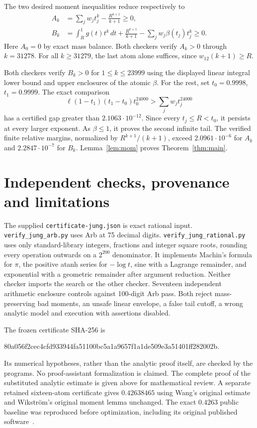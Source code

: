 \documentclass[11pt]{article}
\begin{document}
The two desired moment inequalities reduce respectively to
\begin{align*}
 A_k&=\sum_jw_jt_j^k-\frac{R^{k+1}}{k+1}\ge0,\\
 B_k&=\int_R^1g(t)t^k\,dt+\frac{R^{k+1}}{k+1}
       -\sum_jw_j\beta(t_j)t_j^k\ge0.
\end{align*}
Here $A_0=0$ by exact mass balance. Both checkers verify $A_k>0$ through
$k=31278$. For all $k\ge31279$, the last atom alone suffices, since
$w_{12}(k+1)\ge R$.

Both checkers verify $B_k>0$ for $1\le k\le23999$ using the displayed
linear integral lower bound and upper enclosures of the atomic $\beta$.
For the rest, set $t_0=0.9998$, $t_1=0.9999$. The exact comparison
\[
 \ell(1-t_1)(t_1-t_0)t_0^{24000}>\sum_jw_jt_j^{24000}
\]
has a certified gap greater than $2.1063\cdot10^{-12}$. Since every
$t_j\le R<t_0$, it persists at every larger exponent. As $\beta\le1$,
it proves the second infinite tail. The verified finite relative margins,
normalized by $R^{k+1}/(k+1)$, exceed $2.0961\cdot10^{-6}$ for $A_k$
and $2.2847\cdot10^{-7}$ for $B_k$. Lemma~\ref{lem:mom} proves
Theorem~\ref{thm:main}.

\section{Independent checks, provenance and limitations}
The supplied \texttt{certificate-jung.json} is exact rational input.
\texttt{verify\_jung\_arb.py} uses Arb at 75 decimal digits.
\texttt{verify\_jung\_rational.py} uses only standard-library integers,
fractions and integer square roots, rounding every operation outwards on a
$2^{200}$ denominator. It implements Machin's formula for $\pi$, the positive
atanh series for $-\log t$, sine with a Lagrange remainder, and exponential
with a geometric remainder after argument reduction. Neither checker imports
the search or the other checker. Seventeen independent arithmetic enclosure
controls against 100-digit Arb pass. Both reject mass-preserving bad moments,
an unsafe linear envelope, a false tail cutoff, a wrong analytic model and
execution with assertions disabled.

The frozen certificate SHA-256 is
\begin{center}\ttfamily\footnotesize
80a056f2cec4cfd933944fa51100bc5a1a9657f1a1de509e3a51401ff282002b.
\end{center}
Its numerical hypotheses, rather than the analytic proof itself, are checked
by the programs. No proof-assistant formalization is claimed. The complete
proof of the substituted analytic estimate is given above for mathematical
review. A separate retained sixteen-atom certificate gives $0.42638465$ using
Wang's original estimate~\cite{Wang2008,Wang} and Wikstr\"om's original moment lemma unchanged.
The exact $0.4263$ public baseline was reproduced before optimization, including
its original published software~\cite{Zenodo}.
\end{document}
